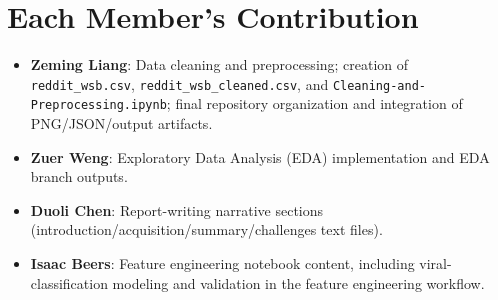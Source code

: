 \section{Each Member's Contribution}
\begin{itemize}
  \item \textbf{Zeming Liang}: Data cleaning and preprocessing; creation of \texttt{reddit\_wsb.csv}, \texttt{reddit\_wsb\_cleaned.csv}, and \texttt{Cleaning-and-Preprocessing.ipynb}; final repository organization and integration of PNG/JSON/output artifacts.
  \item \textbf{Zuer Weng}: Exploratory Data Analysis (EDA) implementation and EDA branch outputs.
  \item \textbf{Duoli Chen}: Report-writing narrative sections (introduction/acquisition/summary/challenges text files).
  \item \textbf{Isaac Beers}: Feature engineering notebook content, including viral-classification modeling and validation in the feature engineering workflow.
\end{itemize}
